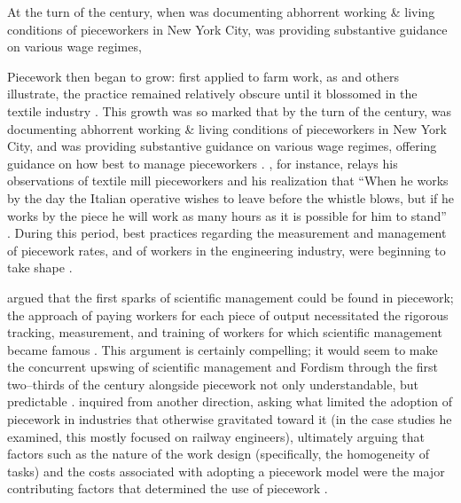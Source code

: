 \documentclass[trackingWork]{subfiles}
\begin{document}
At the turn of the  century,
when \citeauthor{riisOtherSideLives} was documenting abhorrent working \& living conditions of pieceworkers in New York City,
\citeauthor{norton1900textile} was providing substantive guidance on various wage regimes,

Piecework then began to grow: first applied to farm work, as
\citeauthor{hughRaynbirdTaskWork} and others illustrate,
the practice remained relatively obscure until
it blossomed in the textile industry
\cite{hughRaynbirdTaskWork}.
This growth was so marked that by the turn of the  century,
\citeauthor{riisOtherSideLives} was documenting abhorrent working \& living conditions of pieceworkers in New York City,
and \citeauthor{norton1900textile} was providing substantive guidance on various wage regimes,
offering guidance on how best to manage pieceworkers
\cite{riisOtherSideLives,norton1900textile}.
\citeauthor{clark1908cotton}, for instance,
relays his observations of textile mill pieceworkers and his realization that
``When he works by the day the Italian operative wishes to leave before the whistle blows,
but if he works by the piece he will work as many hours as it is possible for him to stand''
\cite{clark1908cotton}.
During this period, best practices regarding the measurement and management of
piecework rates, and of workers in the engineering industry,
were beginning to take shape
\cite{burton1899commercial}.

\citeauthor{10.2307/23702539} argued that the first sparks of scientific management
could be found in piecework;
the approach of paying workers for each piece of output necessitated
the rigorous tracking, measurement, and training of workers
for which scientific management became famous
\cite{10.2307/23702539}.
This argument is certainly compelling;
it would seem to make the concurrent upswing of
scientific management and Fordism
through the first two--thirds of the  century
alongside piecework not only understandable, but predictable
\cite{hart2013rise}.
\citeauthor{Brown01041990} inquired from another direction, asking
what limited the adoption of piecework in industries that otherwise gravitated toward it
(in the case studies he examined, this mostly focused on railway engineers),
ultimately arguing that factors such as the nature of the work design
(specifically, the homogeneity of tasks) and the costs associated with adopting a piecework model
were the major contributing factors that determined the use of piecework
\cite{Brown01041990}.
\end{document}
